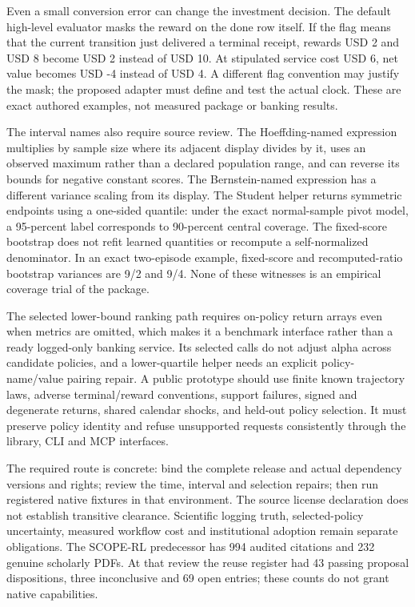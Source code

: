 Even a small conversion error can change the investment decision. The
default high-level evaluator masks the reward on the done row itself. If
the flag means that the current transition just delivered a terminal
receipt, rewards USD 2 and USD 8 become USD 2 instead of USD 10. At
stipulated service cost USD 6, net value becomes USD -4 instead of USD
4. A different flag convention may justify the mask; the proposed
adapter must define and test the actual clock. These are exact authored
examples, not measured package or banking results.
\citep{exec23_scope_rl_sources,exec23_scope_rl_reference}

The interval names also require source review. The Hoeffding-named
expression multiplies by sample size where its adjacent display divides
by it, uses an observed maximum rather than a declared population range,
and can reverse its bounds for negative constant scores. The
Bernstein-named expression has a different variance scaling from its
display. The Student helper returns symmetric endpoints using a
one-sided quantile: under the exact normal-sample pivot model, a
95-percent label corresponds to 90-percent central coverage. The
fixed-score bootstrap does not refit learned quantities or recompute a
self-normalized denominator. In an exact two-episode example,
fixed-score and recomputed-ratio bootstrap variances are 9/2 and 9/4.
None of these witnesses is an empirical coverage trial of the package.
\citep{exec23_scope_rl_sources,exec23_scope_rl_reference}

The selected lower-bound ranking path requires on-policy return arrays
even when metrics are omitted, which makes it a benchmark interface
rather than a ready logged-only banking service. Its selected calls do
not adjust alpha across candidate policies, and a lower-quartile helper
needs an explicit policy-name/value pairing repair. A public prototype
should use finite known trajectory laws, adverse terminal/reward
conventions, support failures, signed and degenerate returns, shared
calendar shocks, and held-out policy selection. It must preserve policy
identity and refuse unsupported requests consistently through the
library, CLI and MCP interfaces.
\citep{exec23_scope_rl_sources,exec23_scope_rl_reference}

The required route is concrete: bind the complete release and actual
dependency versions and rights; review the time, interval and selection
repairs; then run registered native fixtures in that environment. The
source license declaration does not establish transitive clearance.
Scientific logging truth, selected-policy uncertainty, measured workflow
cost and institutional adoption remain separate obligations. The
SCOPE-RL predecessor has 994 audited citations and 232 genuine scholarly
PDFs. At that review the reuse register had 43 passing proposal
dispositions, three inconclusive and 69 open entries; these counts do
not grant native capabilities.
\citep{exec23_scope_rl_sources,sp23scope_reader,sp23scope_progress}

